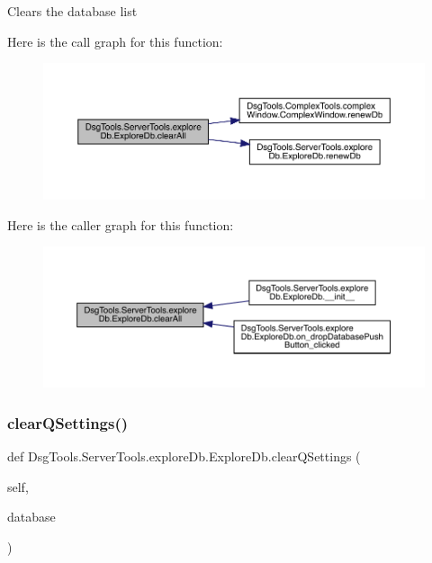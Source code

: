 \begin{DoxyVerb}Clears the database list
\end{DoxyVerb}
 Here is the call graph for this function\+:
\nopagebreak
\begin{figure}[H]
\begin{center}
\leavevmode
\includegraphics[width=350pt]{class_dsg_tools_1_1_server_tools_1_1explore_db_1_1_explore_db_a206527b9629e7cf40d355230e959b4ee_cgraph}
\end{center}
\end{figure}
Here is the caller graph for this function\+:
\nopagebreak
\begin{figure}[H]
\begin{center}
\leavevmode
\includegraphics[width=350pt]{class_dsg_tools_1_1_server_tools_1_1explore_db_1_1_explore_db_a206527b9629e7cf40d355230e959b4ee_icgraph}
\end{center}
\end{figure}
\mbox{\label{class_dsg_tools_1_1_server_tools_1_1explore_db_1_1_explore_db_a2f5bb5f62f93bc8eeaf4201934cba182}} 
\subsubsection{\texorpdfstring{clear\+Q\+Settings()}{clearQSettings()}}
{\footnotesize\ttfamily def Dsg\+Tools.\+Server\+Tools.\+explore\+Db.\+Explore\+Db.\+clear\+Q\+Settings (\begin{DoxyParamCaption}\item[{}]{self,  }\item[{}]{database }\end{DoxyParamCaption})}

